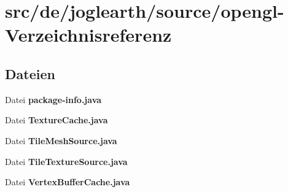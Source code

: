 \section{src/de/joglearth/source/opengl-\/\-Verzeichnisreferenz}
\label{dir_b72928b3a375f193a48ec0c2df3b525c}
\subsection*{Dateien}
\begin{DoxyCompactItemize}
\item 
Datei {\bfseries package-\/info.\-java}
\item 
Datei {\bfseries Texture\-Cache.\-java}
\item 
Datei {\bfseries Tile\-Mesh\-Source.\-java}
\item 
Datei {\bfseries Tile\-Texture\-Source.\-java}
\item 
Datei {\bfseries Vertex\-Buffer\-Cache.\-java}
\end{DoxyCompactItemize}
